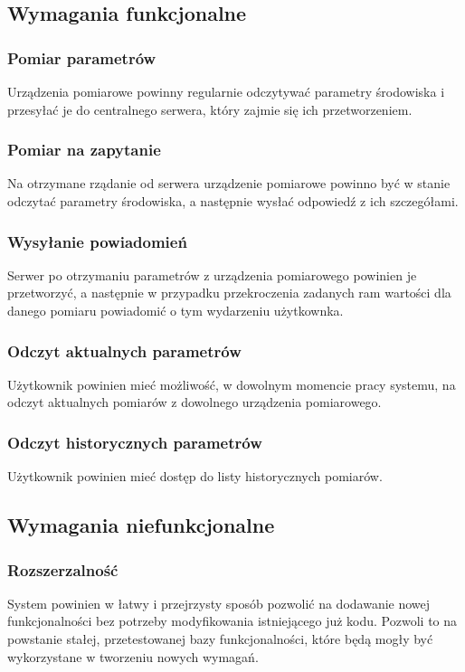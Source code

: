 \documentclass[12pt,a4paper]{article}
\begin{document}
\subsection{Wymagania funkcjonalne}
\subsubsection*{Pomiar parametrów}
Urządzenia pomiarowe powinny regularnie odczytywać parametry środowiska i
przesyłać je do centralnego serwera, który zajmie się ich przetworzeniem.

\subsubsection*{Pomiar na zapytanie}
Na otrzymane rządanie od serwera urządzenie pomiarowe powinno być w stanie
odczytać parametry środowiska, a następnie wysłać odpowiedź z ich szczegółami.

\subsubsection*{Wysyłanie powiadomień}
Serwer po otrzymaniu parametrów z urządzenia pomiarowego powinien je przetworzyć,
a następnie w przypadku przekroczenia zadanych ram wartości dla danego pomiaru
powiadomić o tym wydarzeniu użytkownka.

\subsubsection*{Odczyt aktualnych parametrów}
Użytkownik powinien mieć możliwość, w dowolnym momencie pracy systemu,
na odczyt aktualnych pomiarów z dowolnego urządzenia pomiarowego.

\subsubsection*{Odczyt historycznych parametrów}
Użytkownik powinien mieć dostęp do listy historycznych pomiarów.



\subsection{Wymagania niefunkcjonalne}
\subsubsection*{Rozszerzalność}
System powinien w łatwy i przejrzysty sposób pozwolić na dodawanie nowej funkcjonalności
bez potrzeby modyfikowania istniejącego już kodu. Pozwoli to na powstanie stałej, przetestowanej
bazy funkcjonalności, które będą mogły być wykorzystane w tworzeniu nowych wymagań.
\end{document}
